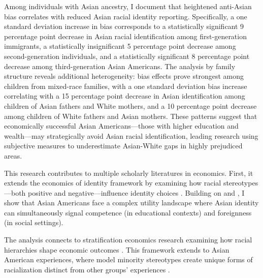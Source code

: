 Among individuals with Asian ancestry, I document that heightened anti-Asian bias correlates with reduced Asian racial identity reporting. Specifically, a one standard deviation increase in bias corresponds to a statistically significant 9 percentage point decrease in Asian racial identification among first-generation immigrants, a statistically insignificant 5 percentage point decrease among second-generation individuals, and a statistically significant 8 percentage point decrease among third-generation Asian Americans. The analysis by family structure reveals additional heterogeneity: bias effects prove strongest among children from mixed-race families, with a one standard deviation bias increase correlating with a 15 percentage point decrease in Asian identification among children of Asian fathers and White mothers, and a 10 percentage point decrease among children of White fathers and Asian mothers. These patterns suggest that economically successful Asian Americans—those with higher education and wealth—may strategically avoid Asian racial identification, leading research using subjective measures to underestimate Asian-White gaps in highly prejudiced areas.

This research contributes to multiple scholarly literatures in economics. First, it extends the economics of identity framework by examining how racial stereotypes—both positive and negative—influence identity choices \autocite{akerlofEconomicsIdentity2000}. Building on \textcite{charnessSocialIdentityGroup2020} and \textcite{atkinHowWeChoose2021}, I show that Asian Americans face a complex utility landscape where Asian identity can simultaneously signal competence (in educational contexts) and foreignness (in social settings).

The analysis connects to stratification economics research examining how racial hierarchies shape economic outcomes \autocite{darityEconomicsIdentityOrigin2006,darityPositionPossessionsStratification2022}. This framework extends to Asian American experiences, where model minority stereotypes create unique forms of racialization distinct from other groups' experiences \autocite{goldsmithDarkLightSkin2007,hamiltonSheddingLightMarriage2009,dietteSkinShadeStratification2015}.


